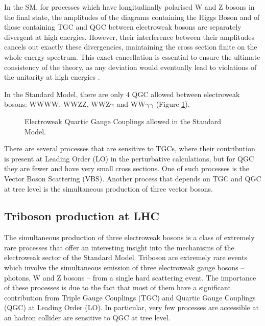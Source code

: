 In the SM, for processes which have longitudinally polarised W and Z bosons in the final state,
the amplitudes of the diagrams containing the Higgs Boson and of those containing TGC and QGC between electroweak bosons are separately divergent at high energies.
However, their interference between their amplitudes cancels out exactly these divergencies, maintaining the cross section finite on the whole energy spectrum.
This exact cancellation is essential to ensure the ultimate consistency of the theory, as any deviation would eventually lead to violations of the unitarity at high energies \cite{PhysRevLett.38.883}.

In the Standard Model, there are only 4 QGC allowed between electroweak bosons: $\mathrm{WWWW}$, $\mathrm{WWZZ}$, $\mathrm{WWZ\gamma}$ and $\mathrm{WW\gamma\gamma}$ (Figure \ref{fig:EWQGC}).
\begin{figure}[ht]
  \centering
  \caption{Electroweak Quartic Gauge Couplings allowed in the Standard Model.}
  \label{fig:EWQGC}
\end{figure}

There are several processes that are sensitive to TGCs, where their contribution is present at Leading Order (LO) in the perturbative calculations,
but for QGC they are fewer and have very small cross sections.
One of such processes is the Vector Boson Scattering (VBS).
Another process that depends on TGC and QGC at tree level is the simultaneous production of three vector bosons.

\subsection{Triboson production at LHC}
The simultaneous production of three electroweak bosons is a class of extremely rare processes that offer an interesting insight into the mechanisms of the electroweak sector of the Standard Model.
Triboson are extremely rare events which involve the simultaneous emission of three electroweak gauge bosons -- photons, W and Z bosons -- from a single hard scattering event.
The importance of these processes is due to the fact that most of them have a significant contribution from Triple Gauge Couplings (TGC) and Quartic Gauge Couplings (QGC) at Leading Order (LO).
In particular, very few processes are accessible at an hadron collider are sensitive to QGC at tree level.

